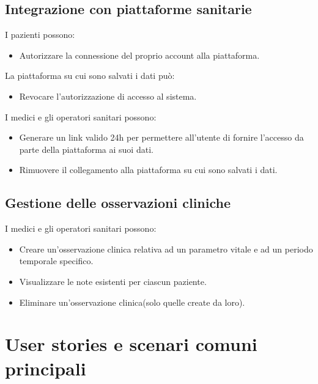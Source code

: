 \documentclass[12pt,a4paper,oneside]{report}
\begin{document}
\subsection{Integrazione con piattaforme sanitarie}
I pazienti possono:
\begin{itemize}
    \item Autorizzare la connessione del proprio account alla piattaforma.
\end{itemize}
La piattaforma su cui sono salvati i dati può:
\begin{itemize}
    \item Revocare l'autorizzazione di accesso al sistema.
\end{itemize}
I medici e gli operatori sanitari possono:
\begin{itemize}
    \item Generare un link valido 24h per permettere all'utente di fornire l'accesso da parte della piattaforma ai suoi dati.
  \item Rimuovere il collegamento alla piattaforma su cui sono salvati i dati.
\end{itemize}
\subsection{Gestione delle osservazioni cliniche}
I medici e gli operatori sanitari possono:
\begin{itemize}
    \item Creare un'osservazione clinica relativa ad un parametro vitale e ad un periodo temporale specifico.
    \item Visualizzare le note esistenti per ciascun paziente.
    \item Eliminare un'osservazione clinica(solo quelle create da loro).
\end{itemize}



\section{User stories e scenari comuni principali}
\end{document}
